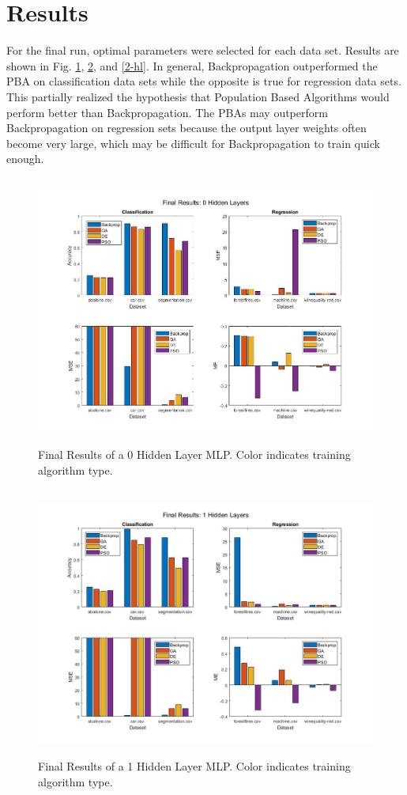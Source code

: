 \documentclass[twoside,11pt]{article}
\begin{document}
\section{Results}

	For the final run, optimal parameters were selected for each data set. Results are shown in Fig. \ref{0-hl}, \ref{1-hl}, and \ref{2-hl}. In general, Backpropagation outperformed the PBA on classification data sets while the opposite is true for regression data sets. This partially realized the hypothesis that Population Based Algorithms would perform better than Backpropagation. The PBAs may outperform Backpropagation on regression sets because the output layer weights often become very large, which may be difficult for Backpropagation to train quick enough.

	\begin{figure}[h]
		\centering
		\includegraphics[height=3.5in]{FINAL_FIGS/0_hl.jpg}
		\caption{Final Results of a 0 Hidden Layer MLP. Color indicates training algorithm type.}
		\label{0-hl}
	\end{figure}

	\begin{figure}[h]
		\centering
		\includegraphics[height=3.5in]{FINAL_FIGS/1_hl.jpg}
		\caption{Final Results of a 1 Hidden Layer MLP. Color indicates training algorithm type.}
		\label{1-hl}
	\end{figure}
\end{document}
